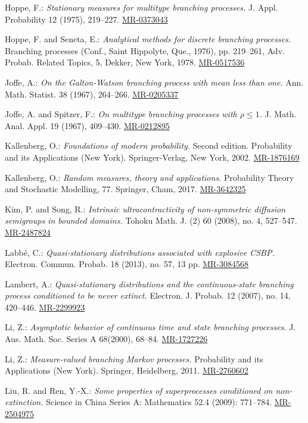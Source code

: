 \documentclass[12pt,a4paper]{amsart}
\numberwithin{equation}{section}
\theoremstyle{plain}
\theoremstyle{definition}
\theoremstyle{remark}
\def\MR#1{\href{http://www.ams.org/mathscinet-getitem?mr=#1}{MR-#1}}
\begin{document}
\begin{thebibliography}{99}
	Hoppe, F.:
	\emph{Stationary measures for multitype branching processes.}
	J. Appl. Probability 12 (1975), 219--227.
	\MR{0373043}
	
	Hoppe, F. and Seneta, E.:
	\emph{Analytical methods for discrete branching processes.}
	Branching processes (Conf., Saint Hippolyte, Que., 1976), pp. 219--261,
	Adv. Probab. Related Topics, 5, Dekker, New York, 1978.
	\MR{0517536}
	
	Joffe, A.:
	\emph{On the Galton-Watson branching process with mean less than one.}
	Ann. Math. Statist. 38 (1967), 264--266.
	\MR{0205337}
	
	Joffe, A. and Spitzer, F.:
	\emph{On multitype branching processes with $\rho \leq 1$.}
	J. Math. Anal. Appl. 19 (1967), 409--430.
	\MR{0212895}
	
	Kallenberg, O.:
	\emph{Foundations of modern probability.}
	Second edition. Probability and its Applications (New York). Springer-Verlag, New York, 2002.
	\MR{1876169}
	
	Kallenberg, O.:
	\emph{Random measures, theory and applications.}
	Probability Theory and Stochastic Modelling, 77. Springer, Cham, 2017.
	\MR{3642325}
	
	Kim, P. and Song, R.:
	\emph{Intrinsic ultracontractivity of non-symmetric diffusion semigroups in bounded domains.}
	Tohoku Math. J. (2) 60 (2008), no. 4, 527--547.
	\MR{2487824}
	
	Labb\'e, C.:
	\emph{Quasi-stationary distributions associated with explosive CSBP.}
	Electron. Commun. Probab. 18 (2013), no. 57, 13 pp.
	\MR{3084568}
	
	Lambert, A.:
	\emph{Quasi-stationary distributions and the continuous-state branching process conditioned to be never extinct.}
	Electron. J. Probab. 12 (2007), no. 14, 420--446.
	\MR{2299923}

	 Li, Z.:
	\emph{Asymptotic behavior of continuous time and state branching processes}.
	J. Aus. Math. Soc. Series A 68(2000), 68--84.
	\MR{1727226}

	Li, Z.:
	\emph{Measure-valued branching Markov processes.}
	Probability and its Applications (New York). Springer, Heidelberg, 2011.
	\MR{2760602}
	
	Liu, R. and Ren, Y.-X.:
	\emph{Some properties of superprocesses conditioned on non-extinction.}
	Science in China Series A: Mathematics 52.4 (2009): 771--784.
	\MR{2504975}
	

\end{thebibliography}
\end{document}
